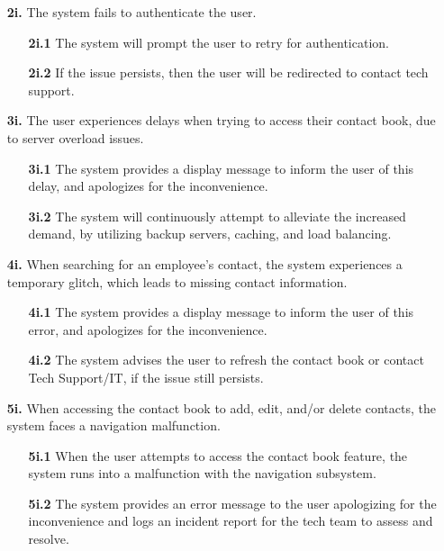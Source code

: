 \documentclass[]{article}
\begin{document}
\begin{enumerate}
	\item[\textbf{2i.}] The system fails to authenticate the user.
		\begin{enumerate}
			\item[\textbf{2i.1}] The system will prompt the user to retry for authentication.
			\item[\textbf{2i.2}] If the issue persists, then the user will be redirected to contact tech support.
		\end{enumerate}
	\item[\textbf{3i.}] The user experiences delays when trying to access their contact book, due to server overload issues.
		\begin{enumerate}
			\item[\textbf{3i.1}] The system provides a display message to inform the user of this delay, and apologizes for the inconvenience.
			\item[\textbf{3i.2}] The system will continuously attempt to alleviate the increased demand, by utilizing backup servers, caching, and load balancing.
		\end{enumerate}
	\item[\textbf{4i.}] When searching for an employee’s contact, the system experiences a temporary glitch, which leads to missing contact information.
		\begin{enumerate}
			\item[\textbf{4i.1}] The system provides a display message to inform the user of this error, and apologizes for the inconvenience.
			\item[\textbf{4i.2}] The system advises the user to refresh the contact book or contact Tech Support/IT, if the issue still persists.
		\end{enumerate}
	\item[\textbf{5i.}] When accessing the contact book to add, edit, and/or delete contacts, the system faces a navigation malfunction.
		\begin{enumerate}
			\item[\textbf{5i.1}] When the user attempts to access the contact book feature, the system runs into a malfunction with the navigation subsystem.
			\item[\textbf{5i.2}] The system provides an error message to the user apologizing for the inconvenience and logs an incident report for the tech team to assess and resolve.
		\end{enumerate}
\end{enumerate}
\end{document}
